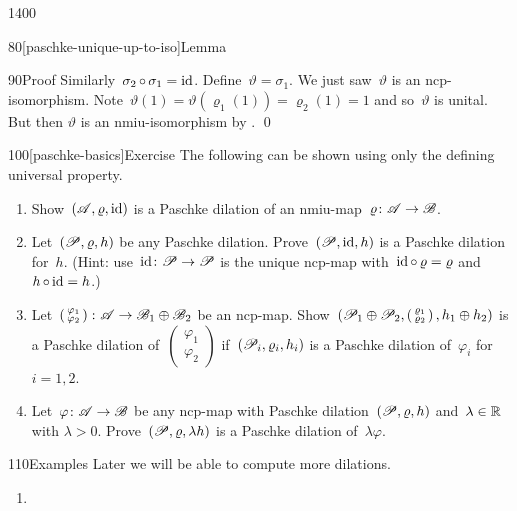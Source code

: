 \begin{parsec}{1400}
\begin{point}{80}[paschke-unique-up-to-iso]{Lemma}
\begin{point}{90}{Proof}
Similarly~$\sigma_2 \mathop{\circ} \sigma_1 = \mathrm{id}$.
Define~$\vartheta = \sigma_1$.
We just saw~$\vartheta$ is an ncp-isomorphism.
Note~$\vartheta(1) = \vartheta(\varrho_1(1)) = \varrho_2(1) = 1$
and so~$\vartheta$ is unital.
But then
    $\vartheta$ is an nmiu-isomorphism
    by . \qed
\par
\end{point}
\end{point}
\spacingfix{}
\begin{point}{100}[paschke-basics]{Exercise}%
The following can be shown using only the defining universal property.
\begin{enumerate}
\item
Show~$(\mathscr{A},\varrho,\mathrm{id})$ is a Paschke dilation of
    an nmiu-map~$\varrho\colon \mathscr{A} \to \mathscr{B}$.
\item
Let~$(\mathscr{P}, \varrho, h)$ be any Paschke dilation.
Prove~$(\mathscr{P}, \mathrm{id}, h)$ is a Paschke dilation for~$h$.
(Hint: use~$\mathrm{id}\colon \mathscr{P} \to \mathscr{P}$
is the unique ncp-map with~$\mathrm{id} \mathop{\circ} \varrho = \varrho$
and~$h \mathop{\circ} \mathrm{id} = h$.)
\item
    Let~$ \left(\begin{smallmatrix} \varphi_1 \\ \varphi_2
    \end{smallmatrix}\right) \colon \mathscr{A} \to \mathscr{B}_1 \oplus \mathscr{B}_2$
    be an ncp-map.
Show~$(\mathscr{P}_1 \oplus \mathscr{P}_2,
        \left(\begin{smallmatrix} \varrho_1 \\ \varrho_2 \end{smallmatrix}\right),
        h_1 \oplus h_2)$
        is a Paschke dilation of~$\left(\begin{smallmatrix} \varphi_1 \\ \varphi_2 
        \end{smallmatrix}\right)$
    if~$(\mathscr{P}_i, \varrho_i, h_i)$
    is a Paschke dilation of~$\varphi_i$ for~$i=1,2$.
\item
Let~$\varphi\colon \mathscr{A} \to \mathscr{B}$
    be any ncp-map with Paschke dilation~$(\mathscr{P}, \varrho, h)$
    and~$\lambda \in \mathbb{R}$ with $\lambda > 0$.
Prove~$(\mathscr{P}, \varrho, \lambda h)$
    is a Paschke dilation of~$\lambda \varphi$.
\end{enumerate}
\spacingfix{}
\end{point}
\begin{point}{110}{Examples}%
Later we will be able to compute more dilations.
\begin{enumerate}
\item

\end{enumerate}
\end{point}
\end{parsec}
